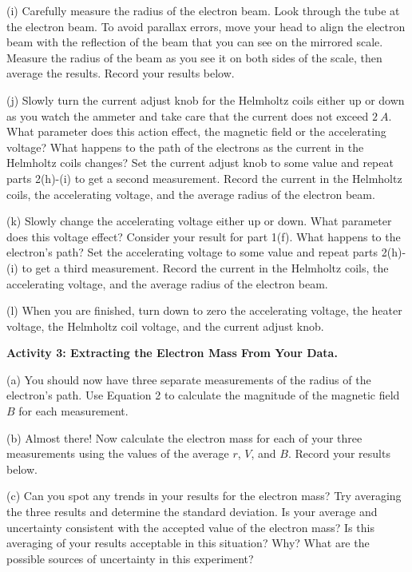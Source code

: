 (i) Carefully measure the radius of the electron beam.
Look through the tube at the electron beam. To avoid
parallax errors, move your head to align the electron
beam with the reflection of the beam that you can see
on the mirrored scale. Measure the radius of the beam as you
see it on both sides of the scale, then average the results.
Record your results below.
\vspace{25mm}

(j) Slowly turn the current adjust knob for the Helmholtz
coils either up or down as you watch the ammeter and take care that
the current does not exceed $2 ~A$.
What parameter does this action effect, the magnetic field or the
accelerating voltage?
What happens to the path of the electrons as the current in the Helmholtz
coils changes?
Set the current adjust knob to some value and
repeat parts 2(h)-(i) to get a second measurement. Record the current in the
Helmholtz coils, the accelerating voltage, and the average radius of the electron beam.
\vspace{30mm}

(k) Slowly change the accelerating voltage either up or down.
What parameter does this voltage effect? Consider your result for part 1(f).
What happens to the electron's path?
Set the accelerating voltage 
to some value and
repeat parts 2(h)-(i) to get a third measurement. Record the current in the
Helmholtz coils, the accelerating voltage, and the average radius of the electron beam.
\vspace{30mm}

(l) When you are finished, turn down to zero the accelerating voltage, the heater voltage, the Helmholtz coil voltage, and the current adjust knob.
\vspace{10mm}

\newpage

\textbf{Activity 3: Extracting the Electron Mass From Your Data.}

(a) You should now have three separate measurements of the radius of the electron's path.
Use Equation 2 to calculate the magnitude of the magnetic field $B$
for each measurement.
\vspace{30mm}

(b) Almost there! Now calculate the electron mass for each of your three measurements using
the values of the average $r$, $V$, and $B$. 
Record your results below.
\vspace{50mm}

(c) Can you spot any trends in your results for the electron mass?
Try averaging the three results and determine the standard deviation.
Is your average and uncertainty consistent with the accepted value of the electron mass?
Is this averaging of your results acceptable in this situation?
Why?
What are the possible sources of uncertainty in this experiment?


